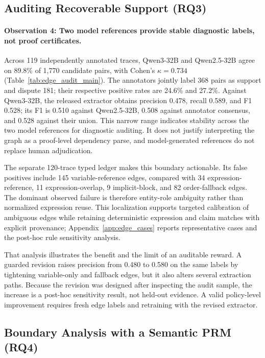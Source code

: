 \subsection{Auditing Recoverable Support (RQ3)}
\label{sec:rq3}



\paragraph{Observation 4: Two model references provide stable diagnostic labels, not proof certificates.}
Across 119 independently annotated traces, Qwen3-32B and Qwen2.5-32B agree on 89.8\% of 1{,}770 candidate pairs, with Cohen's $\kappa=0.734$ (Table~\ref{tab:edge_audit_main}). The annotators jointly label 368 pairs as support and dispute 181; their respective positive rates are 24.6\% and 27.2\%. Against Qwen3-32B, the released extractor obtains precision 0.478, recall 0.589, and F1 0.528; its F1 is 0.510 against Qwen2.5-32B, 0.508 against annotator consensus, and 0.528 against their union. This narrow range indicates stability across the two model references for diagnostic auditing. It does not justify interpreting the graph as a proof-level dependency parse, and model-generated references do not replace human adjudication.

The separate 120-trace typed ledger makes this boundary actionable. Its false positives include 145 variable-reference edges, compared with 34 expression-reference, 11 expression-overlap, 9 implicit-block, and 82 order-fallback edges. The dominant observed failure is therefore entity-role ambiguity rather than normalized expression reuse. This localization supports targeted calibration of ambiguous edges while retaining deterministic expression and claim matches with explicit provenance; Appendix~\ref{app:edge_cases} reports representative cases and the post-hoc rule sensitivity analysis.

That analysis illustrates the benefit and the limit of an auditable reward. A guarded revision raises precision from 0.480 to 0.580 on the same labels by tightening variable-only and fallback edges, but it also alters several extraction paths. Because the revision was designed after inspecting the audit sample, the increase is a post-hoc sensitivity result, not held-out evidence. A valid policy-level improvement requires fresh edge labels and retraining with the revised extractor.

\subsection{Boundary Analysis with a Semantic PRM (RQ4)}
\label{sec:rq4}


